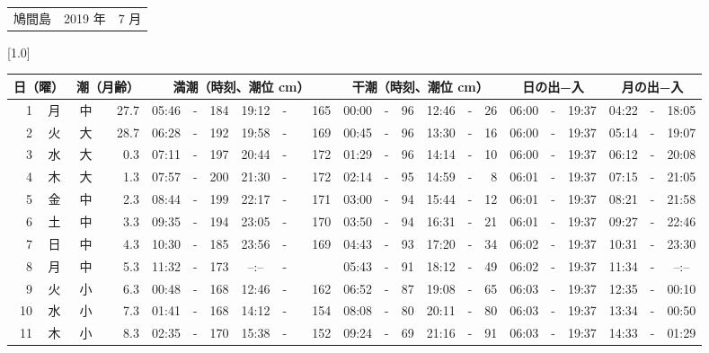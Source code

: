 \documentclass[12pt,a4j]{jsarticle}
\begin{document}
\pagestyle{empty}
 \begin{table}[htbp]
 \begin{center}
 \begin{tabular}{lcc}
 \LARGE{鳩間島}  & \large{2019 年} & \large{ 7 月} \\
 \end{tabular}
 \end{center}
 \begin{center}
    \scalebox{0.7}[1.0]{
    \begin{tabular}{|rc|cr|ccrccr|ccrccr|ccc|ccc|}
    \hline
    \multicolumn{2}{|c|}{日（曜）} & \multicolumn{2}{c|}{潮（月齢）} & \multicolumn{6}{c|}{満潮（時刻、潮位 cm）} & \multicolumn{6}{c|}{干潮（時刻、潮位 cm）} & \multicolumn{3}{c|}{日の出−入} &  \multicolumn{3}{c|}{月の出−入}\\
 \hline
 1 & 月 & 中 & 27.7 &  05:46 &-& 184 &  19:12 &-& 165 &  00:00 &-&  96 &  12:46 &-&  26 & 06:00 & -& 19:37 & 04:22 & -& 18:05 \\
 2 & 火 & 大 & 28.7 &  06:28 &-& 192 &  19:58 &-& 169 &  00:45 &-&  96 &  13:30 &-&  16 & 06:00 & -& 19:37 & 05:14 & -& 19:07 \\
 3 & 水 & 大 &  0.3 &  07:11 &-& 197 &  20:44 &-& 172 &  01:29 &-&  96 &  14:14 &-&  10 & 06:00 & -& 19:37 & 06:12 & -& 20:08 \\
 4 & 木 & 大 &  1.3 &  07:57 &-& 200 &  21:30 &-& 172 &  02:14 &-&  95 &  14:59 &-&   8 & 06:01 & -& 19:37 & 07:15 & -& 21:05 \\
 5 & 金 & 中 &  2.3 &  08:44 &-& 199 &  22:17 &-& 171 &  03:00 &-&  94 &  15:44 &-&  12 & 06:01 & -& 19:37 & 08:21 & -& 21:58 \\
 6 & 土 & 中 &  3.3 &  09:35 &-& 194 &  23:05 &-& 170 &  03:50 &-&  94 &  16:31 &-&  21 & 06:01 & -& 19:37 & 09:27 & -& 22:46 \\
 7 & 日 & 中 &  4.3 &  10:30 &-& 185 &  23:56 &-& 169 &  04:43 &-&  93 &  17:20 &-&  34 & 06:02 & -& 19:37 & 10:31 & -& 23:30 \\
 8 & 月 & 中 &  5.3 &  11:32 &-& 173 &  --:-- &-&~~~~~ &  05:43 &-&  91 &  18:12 &-&  49 & 06:02 & -& 19:37 & 11:34 & -& --:-- \\
 9 & 火 & 小 &  6.3 &  00:48 &-& 168 &  12:46 &-& 162 &  06:52 &-&  87 &  19:08 &-&  65 & 06:03 & -& 19:37 & 12:35 & -& 00:10 \\
10 & 水 & 小 &  7.3 &  01:41 &-& 168 &  14:12 &-& 154 &  08:08 &-&  80 &  20:11 &-&  80 & 06:03 & -& 19:37 & 13:34 & -& 00:50 \\
11 & 木 & 小 &  8.3 &  02:35 &-& 170 &  15:38 &-& 152 &  09:24 &-&  69 &  21:16 &-&  91 & 06:03 & -& 19:37 & 14:33 & -& 01:29 \\

\end{tabular}}
\end{center}
\end{table}
\end{document}
